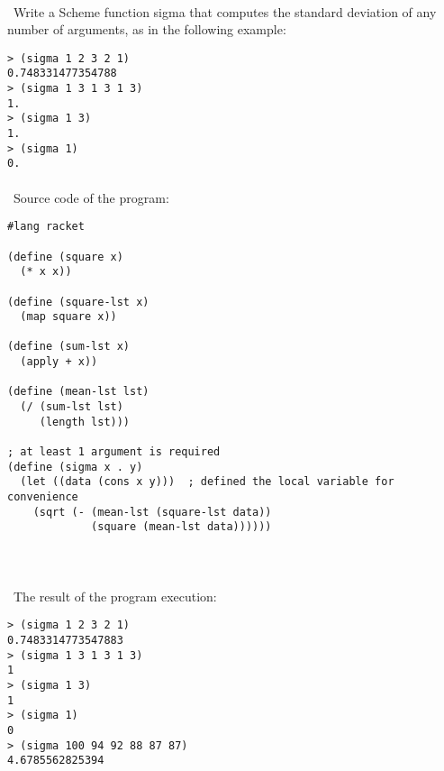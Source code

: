 \documentclass{article}
\begin{document}
\paragraph{}\
		Write a Scheme function sigma that computes the standard deviation of any number of arguments, as in the following example:		
		
\begin{verbatim} 
> (sigma 1 2 3 2 1)
0.748331477354788
> (sigma 1 3 1 3 1 3)
1.
> (sigma 1 3)
1.
> (sigma 1)
0.
\end{verbatim}

\paragraph{}\	
Source code of the program:
	
\begin{verbatim} 
#lang racket

(define (square x)
  (* x x))

(define (square-lst x)
  (map square x))

(define (sum-lst x)
  (apply + x))

(define (mean-lst lst)
  (/ (sum-lst lst)
     (length lst)))

; at least 1 argument is required
(define (sigma x . y)
  (let ((data (cons x y)))	; defined the local variable for convenience
    (sqrt (- (mean-lst (square-lst data))
             (square (mean-lst data))))))
\end{verbatim}	

\paragraph{}\	
\paragraph{}\
	The result of the program execution:
	
\begin{verbatim} 
> (sigma 1 2 3 2 1)
0.7483314773547883
> (sigma 1 3 1 3 1 3)
1
> (sigma 1 3)
1
> (sigma 1)
0
> (sigma 100 94 92 88 87 87)
4.6785562825394
\end{verbatim}
	
\paragraph{}\
\paragraph{}\
\end{document}
